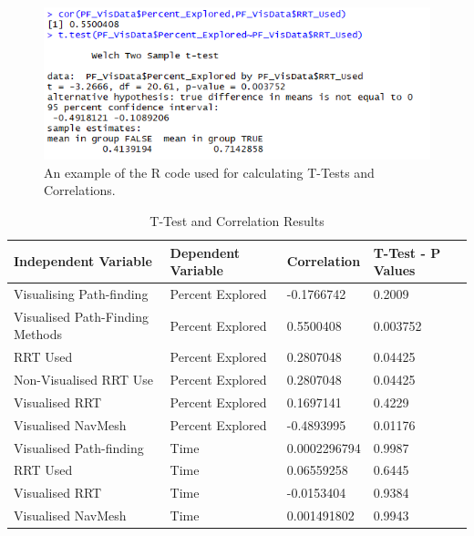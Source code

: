 \documentclass[journal]{IEEEtran}
\begin{document}
	\begin{figure}[h]
		\includegraphics[width=1.0\linewidth]{RCor.png}
		\caption{An example of the R code used for calculating T-Tests and Correlations.}
		\label{image:RCor}
	\end{figure}  
	
	\begin{table}[]
		\centering
		\caption{T-Test and Correlation Results}
		\label{StatsTable}
		\def\arraystretch{1.5}
		\begin{tabular}{|l|l|l|l|}
			\hline
			\textbf{Independent Variable }    &  \textbf{Dependent Variable } & \textbf{Correlation} & \textbf{T-Test - P Values}                   \\ \hline
			Visualising Path-finding& Percent Explored       & -0.1766742   & 0.2009            \\ \hline
			\rowcolor{lightgray}Visualised Path-Finding Methods    & Percent Explored         & 0.5500408    & 0.003752            \\ \hline
			\rowcolor{lightgray}RRT Used        & Percent Explored       & 0.2807048    & 0.04425 \\ \hline
			\rowcolor{lightgray}Non-Visualised RRT Use  
			& Percent Explored       & 0.2807048    & 0.04425  \\ \hline
			Visualised RRT          & Percent Explored       & 0.1697141    & 0.4229            \\ \hline
			\rowcolor{lightgray}    Visualised NavMesh      & Percent Explored       & -0.4893995   & 0.01176           \\ \hline
			Visualised Path-finding & Time                   & 0.0002296794 & 0.9987            \\ \hline
			RRT Used                & Time                   & 0.06559258   & 0.6445            \\ \hline
			Visualised RRT          & Time                   & -0.0153404   & 0.9384            \\ \hline
			Visualised NavMesh      & Time                   & 0.001491802  & 0.9943            \\ \hline

\end{tabular}
\end{table}
\end{document}
